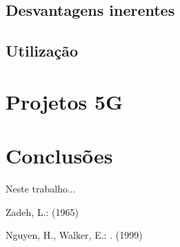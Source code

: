 \documentclass{llncs}
\begin{document}
\subsection{Desvantagens inerentes}
\subsection{Utilização}
\section{Projetos 5G}

\section{Conclusões}

Neste trabalho...

%

\begin{thebibliography}{1}
Zadeh, L.:
 (1965)

Nguyen, H., Walker, E.:
.
 (1999)
\end{thebibliography}
\end{document}

